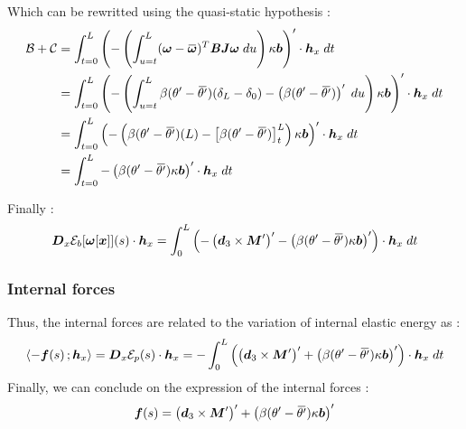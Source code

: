 Which can be rewritted using the quasi-static hypothesis :
\begin{equation}
	\begin{aligned}
	\mathcal{B}+\mathcal{C}
	&=
	\int_{t=0}^{L} \left(
	-\left(\int_{u=t}^{L}(\vect{\omega} - \overbar{\vect{\omega}})^T \mat{B}\mat{J}\vect{\omega}\;du\right)
	\kappa\vect{b}
	\right)'\cdot \vect{h}_x \;dt\\
	&=
	\int_{t=0}^{L} \left(
	-\left(
	\int_{u=t}^{L}\beta(\theta' -{\overbar{\theta'}})(\delta_L-\delta_0) - \left(\beta(\theta' -{\overbar{\theta'}})\right)'\;du
	\right)
	\kappa\vect{b}
	\right)'\cdot \vect{h}_x \;dt\\
	&=
	\int_{t=0}^{L} \left(
	-\left(
	\beta(\theta' -{\overbar{\theta'}})(L) - \left[\beta(\theta' -{\overbar{\theta'}})\right]_t^L
	\right)
	\kappa\vect{b}
	\right)'\cdot \vect{h}_x \;dt\\
		&=
	\int_{t=0}^{L} -\left(
	\beta(\theta' -{\overbar{\theta'}})
	\kappa\vect{b}
	\right)'\cdot \vect{h}_x \;dt\\
	\end{aligned}
\end{equation}

Finally :
\begin{equation}
		\pdiffof{x}{\mathcal{E}_b[\vect{\omega}[\vect{x}]]}{s}{\vect{h}_x}
		=
		\int_{0}^{L} \left(
		- \left({\vect{d}_3} \times \vect{M}'\right)'
		- \left(\beta(\theta' -{\overbar{\theta'}}) \kappa\vect{b}\right)'
		\right)\cdot \vect{h}_x \;dt\\
\end{equation}

\subsubsection{Internal forces}

Thus, the internal forces are related to the variation of internal elastic energy as :
\begin{equation}
	\begin{aligned}
	\scalar{-\vect{f}(s)}{\vect{h}_x} &= \pdiffof{x}{\mathcal{E}_p}{s}{\vect{h}_x}
		=
		- \int_{0}^{L} \left(
		\left({\vect{d}_3} \times \vect{M}'\right)'
		+ \left(\beta(\theta' -{\overbar{\theta'}}) \kappa\vect{b}\right)'
		\right)\cdot \vect{h}_x \;dt\\
	\end{aligned}
\end{equation}
Finally, we can conclude on the expression of the internal forces :
\begin{equation}
	\vect{f}(s) = \left({\vect{d}_3} \times \vect{M}'\right)'
		+ \left(\beta(\theta' -{\overbar{\theta'}}) \kappa\vect{b}\right)'
\end{equation}


